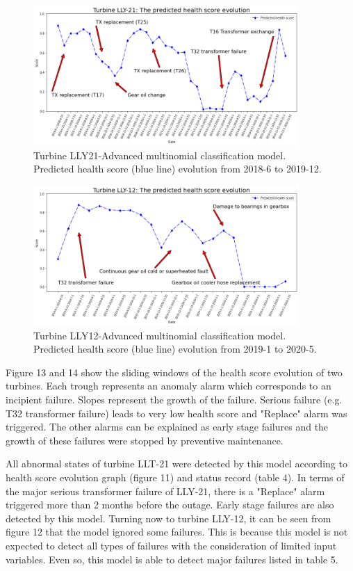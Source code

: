 \begin{figure}[]
\centering
\includegraphics[width=0.9\textwidth]{figures/LLY21_multi.png}
\caption{Turbine LLY21-Advanced multinomial classification model. Predicted health score (blue line) evolution from 2018-6 to 2019-12.}
\label{fig:B-B1}
\end{figure}

\begin{figure}[]
\centering
\includegraphics[width=0.9\textwidth]{figures/LLY12_multi.png}
\caption{Turbine LLY12-Advanced multinomial classification model. Predicted health score (blue line) evolution from 2019-1 to 2020-5.}
\label{fig:B-B1}
\end{figure}

Figure 13 and 14 show the sliding windows of the health score evolution of two turbines. Each trough represents an anomaly alarm which corresponds to an incipient failure. Slopes represent the growth of the failure. Serious failure (e.g. T32 transformer failure) leads to very low health score and "Replace" alarm was triggered. The other alarms can be explained as early stage failures and the growth of these failures were stopped by preventive maintenance.

All abnormal states of turbine LLT-21 were detected by this model according to health score evolution graph (figure 11) and status record (table 4). In terms of the major serious transformer failure of LLY-21, there is a "Replace" alarm triggered more than 2 months before the outage. Early stage failures are also detected by this model. Turning now to turbine LLY-12, it can be seen from figure 12 that the model ignored some failures. This is because this model is not expected to detect all types of failures with the consideration of limited input variables. Even so, this model is able to detect major failures listed in table 5.

